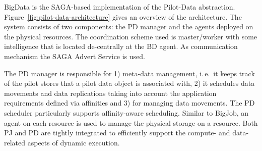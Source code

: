 \documentclass[conference,final]{IEEEtran}
\newcommand{\jhanote}[1]{ {\textcolor{red} { ***shantenu: #1 }}}
\newcommand{\jhanote}[1]{}
\newcommand{\upp}{\vspace*{-0.5em}}
\begin{document}
BigData is the SAGA-based implementation of the Pilot-Data abstraction.
Figure~\ref{fig:pilot-data-architecture} gives an overview of the
architecture. The system consists of two components: the PD manager and
the agents deployed on the physical resources. The coordination 
scheme used is master/worker with some intelligence that is located de-centrally at 
the BD agent. As communication mechanism the SAGA Advert Service is used.


The PD manager is responsible for 1) meta-data management, i.\,e.\ it keeps
track of the pilot stores that a pilot data object is associated with, 2) it
schedules data movements and data replications taking into account the
application requirements defined via affinities and 3) for managing data
movements. The PD scheduler particularly supports affinity-aware scheduling.
Similar to BigJob, an agent on each resource is used to manage the physical
storage on a resource. Both PJ and PD are tightly integrated to efficiently support the compute- and data-related aspects of dynamic execution. 


% 







\end{document}
